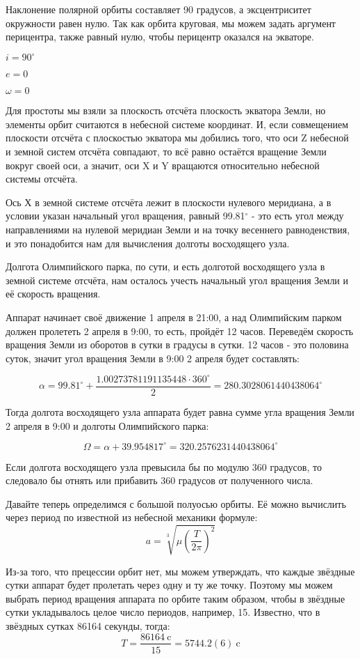 Наклонение полярной орбиты составляет 90 градусов, а эксцентриситет окружности равен нулю. Так как орбита круговая, мы можем задать аргумент перицентра, также равный нулю, чтобы перицентр оказался на экваторе.

$i = 90^\circ$

$e = 0$

$\omega = 0$

Для простоты мы взяли за плоскость отсчёта плоскость экватора Земли, но элементы орбит считаются в небесной системе координат. И, если совмещением плоскости отсчёта с плоскостью экватора мы добились того, что оси Z небесной и земной систем отсчёта совпадают, то всё равно остаётся вращение Земли вокруг своей оси, а значит, оси X и Y вращаются относительно небесной системы отсчёта. 

Ось Х в земной системе отсчёта лежит в плоскости нулевого меридиана, а в условии указан начальный угол вращения, равный 99.81$^\circ$ - это есть угол между направлениями на нулевой меридиан Земли и на точку весеннего равноденствия, и это понадобится нам для вычисления долготы восходящего узла. 

Долгота Олимпийского парка, по сути, и есть долготой восходящего узла в земной системе отсчёта, нам осталось учесть начальный угол вращения Земли и её скорость вращения.

Аппарат начинает своё движение 1 апреля в 21:00, а над Олимпийским парком должен пролететь 2 апреля в 9:00, то есть, пройдёт 12 часов. Переведём скорость вращения Земли из оборотов в сутки в градусы в сутки. 12 часов - это половина суток, значит угол вращения Земли в 9:00 2 апреля будет составлять:

$$\alpha = 99.81^\circ + \frac{1.00273781191135448 \cdot 360^\circ}{2} = 280.3028061440438064^\circ$$

Тогда долгота восходящего узла аппарата будет равна сумме угла вращения Земли 2 апреля в 9:00 и долготы Олимпийского парка:

$$\Omega = \alpha + 39.954817^\circ = 320.2576231440438064^\circ$$

Если долгота восходящего узла превысила бы по модулю 360 градусов, то следовало бы отнять или прибавить 360 градусов от полученного числа.

Давайте теперь определимся с большой полуосью орбиты. Её можно вычислить через период по известной из небесной механики формуле:
$$a=\sqrt[3]{\mu \left(\frac{T}{2\pi}\right)^2}$$

Из-за того, что прецессии орбит нет, мы можем утверждать, что каждые звёздные сутки аппарат будет 
пролетать через одну и ту же точку. Поэтому мы можем выбрать период вращения аппарата по орбите таким образом, 
чтобы в звёздные сутки укладывалось целое число периодов, например, 15. Известно, что в звёздных сутках 
86164 секунды, тогда:
$$T = \frac{86164 \: \text{c}} {15} = 5744.2(6) \: \text{c}$$

